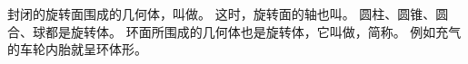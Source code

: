 封闭的旋转面围成的几何体，叫做。 这时，旋转面的轴也叫。
圆柱、圆锥、圆合、球都是旋转体。 环面所围成的几何体也是旋转体，它叫做，简称。
例如充气的车轮内胎就呈环体形。


\begin{lianxi}



\end{lianxi}

